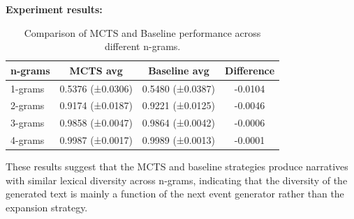 \documentclass[11pt]{article}
\begin{document}
\noindent
\textbf{Experiment results:}
\bigskip

\begin{table}[H]
\centering
\label{tab:mctsvsbaseline}
\begin{tabular}{lccc}
\toprule
\textbf{n-grams} & \textbf{MCTS avg} & \textbf{Baseline avg} & \textbf{Difference} \\
\midrule
1-grams & 0.5376 (±0.0306) & 0.5480 (±0.0387) & -0.0104 \\
2-grams & 0.9174 (±0.0187) & 0.9221 (±0.0125) & -0.0046 \\
3-grams & 0.9858 (±0.0047) & 0.9864 (±0.0042) & -0.0006 \\
4-grams & 0.9987 (±0.0017) & 0.9989 (±0.0013) & -0.0001 \\
\bottomrule
\end{tabular}
\caption{Comparison of MCTS and Baseline performance across different n-grams.}
\end{table}

\noindent
These results suggest that the MCTS and baseline strategies produce narratives with similar lexical diversity across n-grams, indicating that the diversity of the generated text is mainly a function of the next event generator rather than the expansion strategy.
\end{document}
